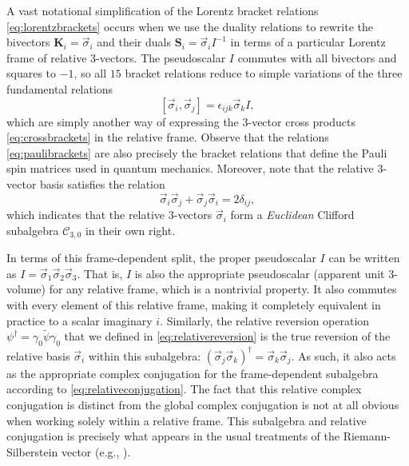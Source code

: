 \documentclass[1p,sort&compress]{elsarticle}
\numberwithin{equation}{section}
\newcommand{\rv}[1]{\vec{#1}}
\newcommand{\bv}[1]{\mathbf{#1}}
\begin{document}
A vast notational simplification of the Lorentz bracket relations \eqref{eq:lorentzbrackets} occurs when we use the duality relations to rewrite the bivectors $\bv{K}_i = \rv{\sigma}_i$ and their duals $\bv{S}_i = \rv{\sigma}_i I^{-1}$ in terms of a particular Lorentz frame of relative 3-vectors.  The pseudoscalar $I$ commutes with all bivectors and squares to $-1$, so all $15$ bracket relations reduce to simple variations of the three fundamental relations
\begin{equation}\label{eq:paulibrackets}
  [\rv{\sigma}_i,\rv{\sigma}_j] = \epsilon_{ijk} \rv{\sigma}_k I,
\end{equation}
which are simply another way of expressing the 3-vector cross products \eqref{eq:crossbrackets} in the relative frame.  Observe that the relations \eqref{eq:paulibrackets} are also precisely the bracket relations that define the Pauli spin matrices used in quantum mechanics.  Moreover, note that the relative 3-vector basis satisfies the relation
\begin{equation}
  \rv{\sigma}_i \rv{\sigma}_j + \rv{\sigma}_j \rv{\sigma}_i = 2 \delta_{ij},
\end{equation}
which indicates that the relative 3-vectors $\rv{\sigma}_i$ form a \emph{Euclidean} Clifford subalgebra $\mathcal{C}_{3,0}$ in their own right.

In terms of this frame-dependent split, the proper pseudoscalar $I$ can be written as $I = \rv{\sigma}_1\rv{\sigma}_2\rv{\sigma}_3$.  That is, $I$ is also the appropriate pseudoscalar (apparent unit 3-volume) for any relative frame, which is a nontrivial property.  It also commutes with every element of this relative frame, making it completely equivalent in practice to a scalar imaginary $i$.  Similarly, the relative reversion operation $\psi^\dagger = \gamma_0\widetilde{\psi}\gamma_0$ that we defined in \eqref{eq:relativereversion} is the true reversion of the relative basis $\rv{\sigma}_i$ within this subalgebra: $(\rv{\sigma}_j\rv{\sigma}_k)^\dagger = \rv{\sigma}_k\rv{\sigma}_j$.  As such, it also acts as the appropriate complex conjugation for the frame-dependent subalgebra according to \eqref{eq:relativeconjugation}.  The fact that this relative complex conjugation is distinct from the global complex conjugation is not at all obvious when working solely within a relative frame.  This subalgebra and relative conjugation is precisely what appears in the usual treatments of the Riemann-Silberstein vector (e.g., \cite{Bialynicki-Birula2013}).
\end{document}
